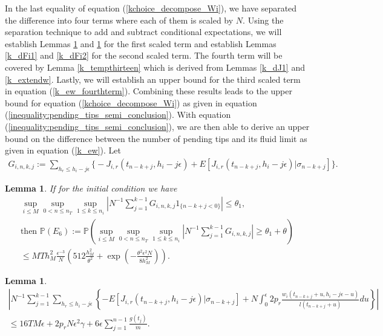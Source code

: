 \documentclass[12pt]{article}
\def\P{\mathbb{P}}
\numberwithin{equation}{section}  %
\newtheorem{lem}[thm]{Lemma}
\begin{document}
In the last equality of equation (\ref{kchoice_decompose_Wi}), we have separated the difference into four terms where each of them is scaled by $N$. Using the separation technique to add and subtract conditional expectations, we will establish Lemmas \ref{k_dG1} and \ref{k_dG2} for the first scaled term and establish Lemmas \ref{k_dFi1} and \ref{k_dFi2} for the second scaled term. The fourth term will be covered by Lemma \ref{k_tempthirteen} which is derived from Lemmas \ref{k_dJ1} and \ref{k_extendw}.
Lastly, we will establish an upper bound for the third scaled term in equation (\ref{k_ew_fourthterm}). Combining these results leads to the upper bound for equation (\ref{kchoice_decompose_Wi}) as given in equation (\ref{inequality:pending_tips_semi_conclusion}). With equation (\ref{inequality:pending_tips_semi_conclusion}), we are then able to derive an upper bound on the difference between the number of pending tips and its fluid limit as given in equation (\ref{k_ew}). Let 
\begin{align*}
 G_{i,n,k,j}:=\sum_{h_r\leq h_i-j\epsilon}
\Big\{
-J_{i,r}(t_{n-k+j},h_i-j\epsilon)+E[J_{i,r}(t_{n-k+j},h_i-j\epsilon)|\sigma_{n-k+j}]
\Big\}.
\end{align*}

\begin{lem}\label{k_dG1} %
If for the initial condition we have 
\begin{align} 
\sup_{i\leq M}\sup_{0<n\leq n_T}\sup_{1\leq k\leq n_i}\left|N^{-1}\sum_{j=1}^{k-1} G_{i,n,k,j}1_{\{n-k+j< 0\}}\right|\leq\theta_1,\label{kchoice_ini_eq5}\\
\text{then }\P(E_6):=\P\left(\sup_{i\leq M}\sup_{0<n\leq n_T}\sup_{1\leq k\leq n_i}\left|
  N^{-1} \sum_{j=1}^{k-1}  G_{i,n,k,j}
\right|\geq \theta_1+\theta
\right)\nonumber\\
\leq M T h_M^2 \frac{\epsilon^{-3}}{N}
\left(
512\frac{h_M^2}{\theta^2}+\exp\left(
-\frac{\theta^2 \epsilon^2 N}{8h^2_M}\right)
\right).\nonumber
\end{align} 
\end{lem}

\begin{lem}\label{k_dG2}%
{\footnotesize
\begin{align*} 
\left|
  N^{-1} \sum_{j=1}^{k-1} \sum_{h_r\leq h_i-j\epsilon}
\left\{
-E[J_{i,r}(t_{n-k+j},h_i-j\epsilon)|\sigma_{n-k+j}]+
N \int_{0}^{\epsilon}2 p_r\frac{w_i(t_{n-k+j}+u,h_i-j\epsilon-u)}{l(t_{n-k+j}+u)}du
\right\}
\right|\\
\leq16 T M \epsilon+2p_r N \epsilon^2 \gamma +6\epsilon\sum_{j=1}^{n-1} \frac{g(t_{j})}{m}.
\end{align*}}
\end{lem}
\end{document}
